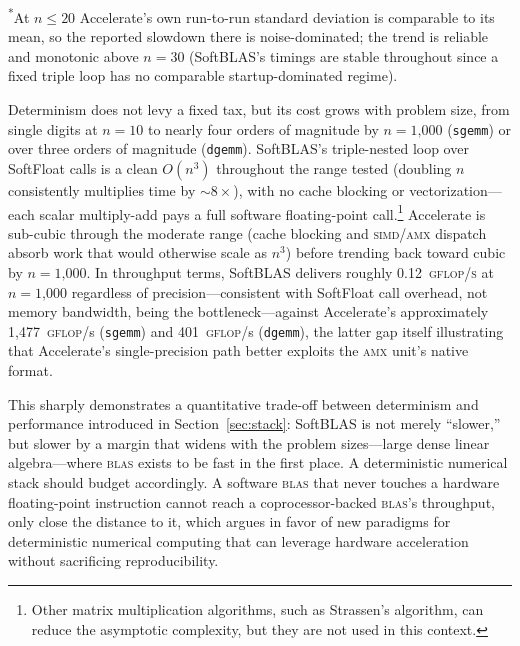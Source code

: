 \documentclass[twoside]{article}
\begin{document}
\textsuperscript{*}At $n\leq\text{20}$ Accelerate's own run-to-run standard deviation is comparable to its mean, so the reported slowdown there is noise-dominated; the trend is reliable and monotonic above $n=\text{30}$ (SoftBLAS's timings are stable throughout since a fixed triple loop has no comparable startup-dominated regime).

Determinism does not levy a fixed tax, but its cost grows with problem size, from single digits at $n=\text{10}$ to nearly four orders of magnitude by $n=\text{1,000}$ (\texttt{sgemm}) or over three orders of magnitude (\texttt{dgemm}).  SoftBLAS's triple-nested loop over SoftFloat calls is a clean $O(n^3)$ throughout the range tested (doubling $n$ consistently multiplies time by $\sim\!8\times$), with no cache blocking or vectorization---each scalar multiply-add pays a full software floating-point call.\footnote{Other matrix multiplication algorithms, such as Strassen's algorithm, can reduce the asymptotic complexity, but they are not used in this context.}  Accelerate is sub-cubic through the moderate range (cache blocking and \textsc{simd}/\textsc{amx} dispatch absorb work that would otherwise scale as $n^3$) before trending back toward cubic by $n=\text{1,000}$.  In throughput terms, SoftBLAS delivers roughly 0.12~\textsc{gflop/s} at $n=\text{1,000}$ regardless of precision---consistent with SoftFloat call overhead, not memory bandwidth, being the bottleneck---against Accelerate's approximately 1,477~\textsc{gflop}/s (\texttt{sgemm}) and 401~\textsc{gflop}/s (\texttt{dgemm}), the latter gap itself illustrating that Accelerate's single-precision path better exploits the \textsc{amx} unit's native format.

This sharply demonstrates a quantitative trade-off between determinism and performance introduced in Section~\ref{sec:stack}: SoftBLAS is not merely ``slower,'' but slower by a margin that widens with the problem sizes---large dense linear algebra---where \textsc{blas} exists to be fast in the first place.  A deterministic numerical stack should budget accordingly.  A software \textsc{blas} that never touches a hardware floating-point instruction cannot reach a coprocessor-backed \textsc{blas}'s throughput, only close the distance to it, which argues in favor of new paradigms for deterministic numerical computing that can leverage hardware acceleration without sacrificing reproducibility.
\end{document}
